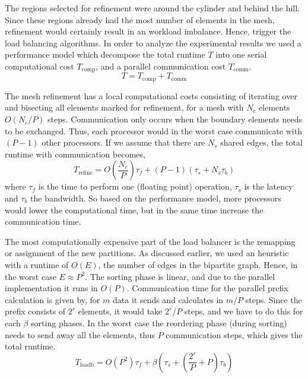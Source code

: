 The regions selected for refinement were around the cylinder and
behind the hill. Since these regions already had the most number of
elements in the mesh, refinement would certainly result in an workload
imbalance. Hence, trigger the load balancing algorithms. In order to
analyze the experimental results we used a performance model which
decompose the total runtime $T$ into one serial computational cost
$T_\textrm{comp}$, and a parallel communication cost $T_\textrm{comm}$.
\begin{equation}
  T = T_\textrm{comp} + T_\textrm{comm}
\end{equation}

The mesh refinement has a local computational costs consisting of
iterating over and bisecting all elements marked for refinement, for a
mesh with $N_c$ elements $O(N_c/P)$ steps. Communication only occurs
when the boundary elements needs to be exchanged. Thus, each processor
would in the worst case communicate with $(P-1)$ other processors. If
we assume that there are $N_s$ shared edges, the total runtime with
communication becomes,
\begin{equation}
\label{hoffman-4:eq:refine_time}
  T_\textrm{refine} = O\left(\frac{N_c}{P} \right) \tau_f + (P-1)(\tau_s + N_s \tau_b)
\end{equation}
where $\tau_f$ is the time to perform one (floating point) operation,
$\tau_s$ is the latency and $\tau_b$ the bandwidth. So based on the
performance model, more processors would lower the computational time,
but in the same time increase the communication time.

The most computationally expensive part of the load balancer is the
remapping or assignment of the new partitions. As discussed earlier,
we used an heuristic with a runtime of $O(E)$, the number of edges in
the bipartite graph. Hence, in the worst case $ E \approx P^2$. The
sorting phase is linear, and due to the parallel implementation it
runs in $O(P)$. Communication time for the parallel prefix calculation
is given by, for $m$ data it sends and calculates in $m/P$
steps. Since the prefix consists of $2^r$ elements, it would take
$2^r/P$ steps, and we have to do this for each $\beta$ sorting
phases. In the worst case the reordering phase (during sorting) needs
to send away all the elements, thus $P$ communication steps, which
gives the total runtime.
\begin{equation}
  \label{hoffman-4:eq:load_time}
  T_\textrm{loadb} = O(P^2) \tau_f + \beta \left( \tau_s + \left( \frac{2^r}{P} + P \right) \tau_b \right)
\end{equation}

